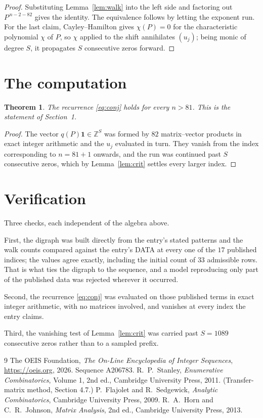 \documentclass[11pt,a4paper]{article}
\theoremstyle{plain}
\newtheorem{theorem}{Theorem}
\theoremstyle{definition}
\begin{document}
\begin{proof}
Substituting Lemma~\ref{lem:walk} into the left side and factoring out
$P^{\,n-2-82}$ gives the identity. The equivalence follows by letting the exponent
run. For the last claim, Cayley--Hamilton gives $\chi(P)=0$ for the characteristic
polynomial $\chi$ of $P$, so $\chi$ applied to the shift annihilates $(u_j)$; being monic of
degree $S$, it propagates $S$ consecutive zeros forward.
\end{proof}

\section{The computation}

\begin{theorem}
The recurrence \eqref{eq:conj} holds for every $n>81$. This is the statement of
Section~1.
\end{theorem}

\begin{proof}
The vector $q(P)\mathbf{1}\in\mathbb{Z}^{S}$ was formed by $82$ matrix--vector
products in exact integer arithmetic and the $u_j$ evaluated in turn. They vanish from the
index corresponding to $n=81+1$ onwards, and the run was continued past $S$ consecutive
zeros, which by Lemma~\ref{lem:crit} settles every larger index.
\end{proof}

\section{Verification}

Three checks, each independent of the algebra above.

First, the digraph was built directly from the entry's stated patterns and the walk counts
compared against the entry's DATA at every one of the $17$ published indices; the
values agree exactly, including the initial count of $33$ admissible rows. That is
what ties the digraph to the sequence, and a model reproducing only part of the published
data was rejected wherever it occurred.

Second, the recurrence \eqref{eq:conj} was evaluated on those published terms in exact
integer arithmetic, with no matrices involved, and vanishes at every index the entry claims.

Third, the vanishing test of Lemma~\ref{lem:crit} was carried past $S=1089$ consecutive
zeros rather than to a sampled prefix.

\begin{thebibliography}{9}
 The OEIS Foundation, \emph{The On-Line Encyclopedia of Integer
Sequences}, \url{https://oeis.org}, 2026. Sequence A206783.
 R.~P.~Stanley, \emph{Enumerative Combinatorics}, Volume 1, 2nd ed.,
Cambridge University Press, 2011. (Transfer-matrix method, Section 4.7.)
 P.~Flajolet and R.~Sedgewick, \emph{Analytic Combinatorics}, Cambridge
University Press, 2009.
 R.~A.~Horn and C.~R.~Johnson, \emph{Matrix Analysis}, 2nd ed., Cambridge
University Press, 2013.
\end{thebibliography}
\end{document}
